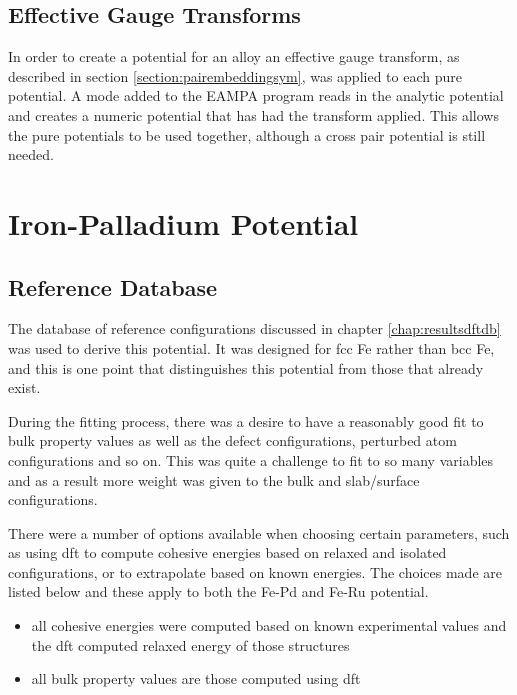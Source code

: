 \subsection{Effective Gauge Transforms}

In order to create a potential for an alloy an effective gauge transform, as described in section \ref{section:pairembeddingsym}, was applied to each pure potential.  A mode added to the EAMPA program reads in the analytic potential and creates a numeric potential that has had the transform applied.  This allows the pure potentials to be used together, although a cross pair potential is still needed.






\FloatBarrier
\section{Iron-Palladium Potential}
\label{section:fepdpotentialresult}

\subsection{Reference Database}

The database of reference configurations discussed in chapter \ref{chap:resultsdftdb} was used to derive this potential.  It was designed for \acrshort{fcc} Fe rather than \acrshort{bcc} Fe, and this is one point that distinguishes this potential from those that already exist.

During the fitting process, there was a desire to have a reasonably good fit to bulk property values as well as the defect configurations, perturbed atom configurations and so on.  This was quite a challenge to fit to so many variables and as a result more weight was given to the bulk and slab/surface configurations.

There were a number of options available when choosing certain parameters, such as using \acrshort{dft} to compute cohesive energies based on relaxed and isolated configurations, or to extrapolate based on known energies.  The choices made are listed below and these apply to both the Fe-Pd and Fe-Ru potential.

\begin{itemize}
\item all cohesive energies were computed based on known experimental values and the \acrshort{dft} computed relaxed energy of those structures
\item all bulk property values are those computed using \acrshort{dft}
\end{itemize}
 

